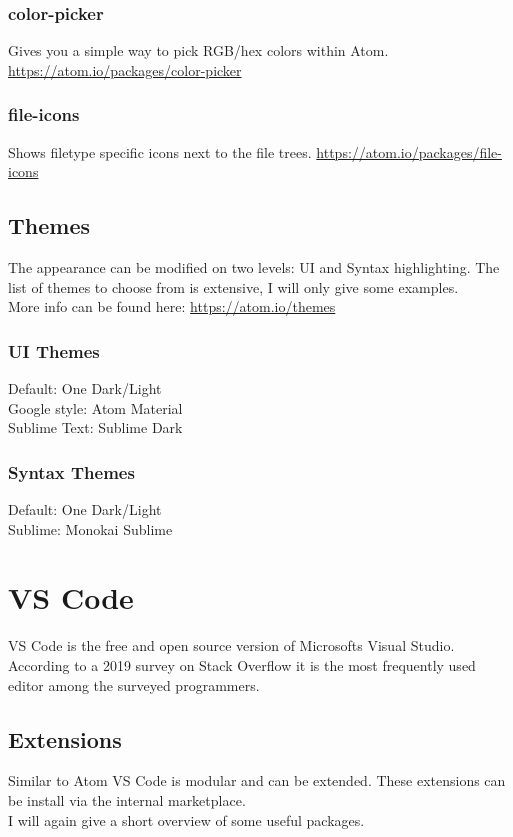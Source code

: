 \documentclass[10pt,a4paper]{article}
\begin{document}
\subsubsection{color-picker}
Gives you a simple way to pick RGB/hex colors within Atom. \url{https://atom.io/packages/color-picker}

\subsubsection{file-icons}
Shows filetype specific icons next to the file trees. \url{https://atom.io/packages/file-icons}


\subsection{Themes}
The appearance can be modified on two levels: UI and Syntax highlighting. The list of themes to choose from is extensive, I will only give some examples.\\
More info can be found here: \url{https://atom.io/themes}

\subsubsection{UI Themes}
Default: One Dark/Light\\
Google style: Atom Material\\
Sublime Text: Sublime Dark

\subsubsection{Syntax Themes}
Default: One Dark/Light\\
Sublime: Monokai Sublime\\

\section{VS Code}

VS Code is the free and open source version of Microsofts Visual Studio. According to a 2019 survey on Stack Overflow it is the most frequently used editor among the surveyed programmers.

\subsection{Extensions}

Similar to Atom VS Code is modular and can be extended. These extensions can be install via the internal marketplace.\\
I will again give a short overview of some useful packages.
\end{document}
